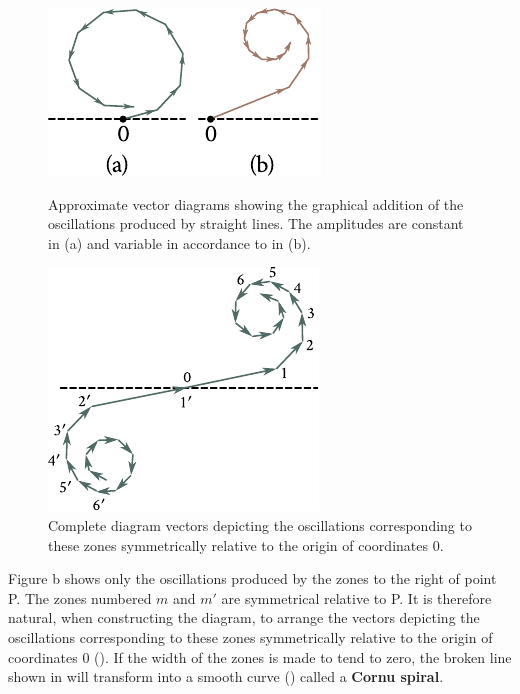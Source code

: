 \begin{figure}[!htb]
	\begin{minipage}[t]{0.48\linewidth}
		\begin{center}
			\includegraphics[scale=1]{figures/ch_18/fig_18_17.pdf}
            \caption[]{Approximate vector diagrams showing the graphical addition of the oscillations produced by straight lines. The amplitudes are constant in (a) and variable in accordance to  in (b).}
			\label{fig:18_17}
		\end{center}
	\end{minipage}
	\hfill{ }%
	\begin{minipage}[t]{0.48\linewidth}
		\begin{center}
			\includegraphics[scale=1]{figures/ch_18/fig_18_18.pdf}
			\caption[]{Complete diagram vectors depicting the oscillations corresponding to these zones symmetrically relative to the origin of coordinates $0$.}
			\label{fig:18_18}
		\end{center}
	\end{minipage}
\vspace{-0.4cm}
\end{figure}

Figure b shows only the oscillations produced by the zones to the right of point P.
The zones numbered $m$ and $m'$ are symmetrical relative to P.
It is therefore natural, when constructing the diagram, to arrange the vectors depicting the oscillations corresponding to these zones symmetrically relative to the origin of coordinates $0$ ().
If the width of the zones is made to tend to zero, the broken line shown in  will transform into a smooth curve () called a \textbf{Cornu spiral}.

